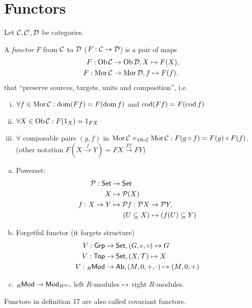 \documentclass[a4paper]{report}
\begin{document}
\section{Functors}
Let $\mathcal{C}, \mathcal{C}', \mathcal{D}$ be categories.
\begin{defi}
A \emph{functor} $F$ from $\mathcal{C}$ to $\mathcal{D}$ ($F: \mathcal{C} \to \mathcal{D}$) is a pair of maps \begin{align*}
  F: \operatorname{Ob} \mathcal{C} &\to \operatorname{Ob} \mathcal{D}, X \mapsto F(X),\\
  F: \operatorname{Mor} \mathcal{C} &\to \operatorname{Mor} \mathcal{D}, f \mapsto F(f).
\end{align*}
that ``preserve sources, targets, units and composition'', i.e.
\begin{enumerate}[(i)]
  \item $\forall f \in \operatorname{Mor} \mathcal{C} : \operatorname{dom} (Ff) = F(\operatorname{dom} f)$ and $\operatorname{cod} (Ff) = F(\operatorname{cod} f)$
  \item $\forall X \in \operatorname{Ob} \mathcal{C}: F(1_{X}) = 1_{FX}$
      \item $\forall$ composable pairs $(g,f)$ in $\operatorname{Mor} \mathcal{C} \times_{\operatorname{Ob} \mathcal{C}} \operatorname{Mor} \mathcal{C} : F(g \circ f) = F(g) \circ F(f)$. (other notation $F(X \xrightarrow f Y ) = FX \xrightarrow {Ff} FY$)
\end{enumerate}
\end{defi}
\begin{exmps*}
\begin{enumerate}[(a)]
  \item Powerset: \begin{align*}
    \mathcal P : \mathsf{Set} &\to \mathsf{Set} \\
    X &\mapsto \mathcal P(X) \\
    f: X \to Y &\mapsto \mathcal Pf: \mathcal PX \to \mathcal PY, \\
    &\quad\ \  (U \subseteq X) \mapsto (f(U) \subseteq Y)
  \end{align*}

  \item Forgetful functor (it forgets structure)
  \begin{align*}
  V: \mathsf{Grp} & \to \mathsf{Set}, (G, e, \circ) \mapsto G \\
  V: \mathsf{Top} & \to \mathsf{Set}, (X, \mathcal{T}) \mapsto X \\
  V: {}_R\mathsf{Mod} & \to \mathsf{Ab}, (M, 0, +, \cdot) \mapsto (M, 0, +)
  \end{align*}
  \item ${}_R\mathsf{Mod} \to \mathsf{Mod}_{R^\mathrm{op}},$ left $R$-modules $\mapsto$ right $R$-modules.

\end{enumerate}
\end{exmps*}

\begin{rem*}
Functors in definition 17 are also called covariant functors.
\end{rem*}
\end{document}
